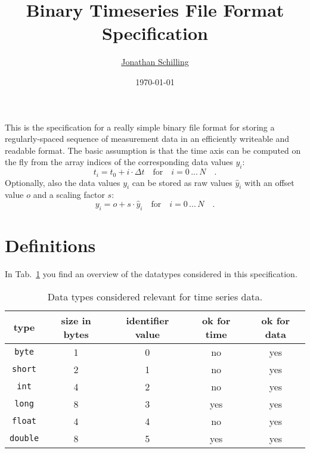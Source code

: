 \documentclass[a4paper,10pt]{article}
\title{Binary Timeseries File Format Specification}
\author{\href{mailto:jonathan.schilling@ipp.mpg.de}{Jonathan Schilling}}
\date{\today}
\begin{document}
\maketitle

This is the specification for a really simple binary file format for storing a regularly-spaced sequence of measurement data
in an efficiently writeable and readable format.
The basic assumption is that the time axis can be computed on the fly from the array indices of the corresponding data values $y_i$:
\begin{equation}
  t_i = t_0 + i \cdot \Delta t \quad \mathrm{for} \quad i = 0\, ...\, N \quad .
\end{equation}
Optionally, also the data values $y_i$ can be stored as raw values $\hat{y}_i$ with an offset value $o$ and a scaling factor $s$:
\begin{equation}
  y_i = o + s \cdot \hat{y}_i \quad \mathrm{for} \quad i = 0\, ...\, N \quad .
\end{equation}

\section{Definitions}
In Tab.~\ref{tab:datatypes} you find an overview of the datatypes considered in this specification.
\begin{table}[htbp]
 \centering
 \begin{tabular}{|c|c|c|c|c|}
    \hline
    type            & size in bytes & identifier value & ok for time & ok for data \\
    \hline
    \texttt{byte}   & 1             & 0                & no          & yes         \\
    \hline
    \texttt{short}  & 2             & 1                & no          & yes         \\
    \hline
    \texttt{int}    & 4             & 2                & no          & yes         \\
    \hline
    \texttt{long}   & 8             & 3                & yes         & yes         \\
    \hline
    \texttt{float}  & 4             & 4                & no          & yes         \\
    \hline
    \texttt{double} & 8             & 5                & yes         & yes         \\
    \hline
 \end{tabular}
 \caption{Data types considered relevant for time series data.}
 \label{tab:datatypes}
\end{table}
\end{document}
